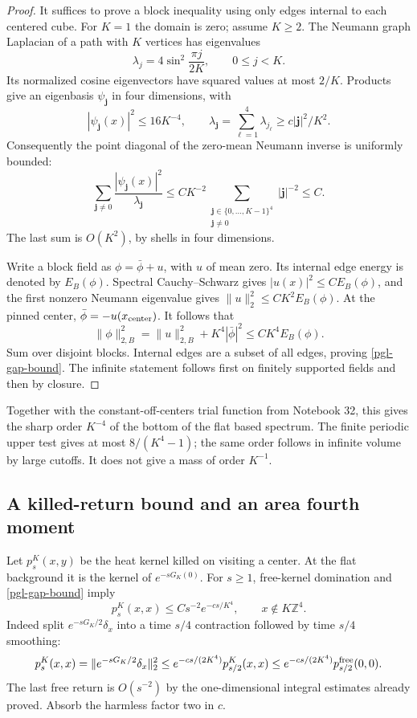 \documentclass[11pt]{article}
\theoremstyle{remark}
\begin{document}
\begin{proof}
It suffices to prove a block inequality using only
edges internal to each centered cube. For \(K=1\)
the domain is zero; assume \(K\ge2\).
The Neumann graph Laplacian of a path with \(K\)
vertices has eigenvalues
\[
 \lambda_j=4\sin^2\frac{\pi j}{2K},\qquad
                  0\le j<K.
\]
Its normalized cosine eigenvectors have squared
values at most \(2/K\). Products give an eigenbasis
\(\psi_{\boldsymbol j}\) in four dimensions, with
\[
 |\psi_{\boldsymbol j}(x)|^2\le16K^{-4},\qquad
 \lambda_{\boldsymbol j}
       =\sum_{\ell=1}^4\lambda_{j_\ell}
                          \ge c|\boldsymbol j|^2/K^2.
\]
Consequently the point diagonal of the zero-mean
Neumann inverse is uniformly bounded:
\[
 \sum_{\boldsymbol j\ne0}
       \frac{|\psi_{\boldsymbol j}(x)|^2}
            {\lambda_{\boldsymbol j}}
 \le CK^{-2}
       \sum_{\substack{\boldsymbol j\in\{0,\ldots,K-1\}^4\\
                        \boldsymbol j\ne0}}
                              |\boldsymbol j|^{-2}\le C.
\]
The last sum is \(O(K^2)\), by shells in four dimensions.

Write a block field as \(\phi=\bar\phi+u\), with
\(u\) of mean zero. Its internal edge energy is
denoted by \(E_B(\phi)\). Spectral Cauchy--Schwarz
gives \(|u(x)|^2\le C E_B(\phi)\), and the first
nonzero Neumann eigenvalue gives
\(\|u\|_2^2\le CK^2 E_B(\phi)\).
At the pinned center, \(\bar\phi=-u(x_{\rm center})\).
It follows that
\[
 \|\phi\|_{2,B}^2=\|u\|_{2,B}^2+K^4|\bar\phi|^2
                                  \le CK^4 E_B(\phi).
\]
Sum over disjoint blocks. Internal edges are a
subset of all edges, proving \eqref{pgl-gap-bound}.
The infinite statement follows first on finitely
supported fields and then by closure.
\end{proof}

Together with the constant-off-centers trial function
from Notebook 32, this gives the sharp order \(K^{-4}\)
of the bottom of the flat based spectrum. The finite
periodic upper test gives at most \(8/(K^4-1)\);
the same order follows in infinite volume by large
cutoffs. It does not give a mass of order \(K^{-1}\).

\subsection{A killed-return bound and an area fourth moment}
\label{pgl-tail-inputs-section}

Let \(p_s^K(x,y)\) be the heat kernel killed on visiting
a center. At the flat background it is the kernel of
\(e^{-sG_K(0)}\). For \(s\ge1\), free-kernel domination
and \eqref{pgl-gap-bound} imply
\begin{equation}
 p_s^K(x,x)\le Cs^{-2}e^{-c s/K^4},
                         \qquad x\notin K\mathbb Z^4.
 \label{pgl-killed-return}
\end{equation}
Indeed split \(e^{-sG_K/2}\delta_x\) into a time
\(s/4\) contraction followed by time \(s/4\)
smoothing:
\[
 p_s^K(x,x)
 =\|e^{-sG_K/2}\delta_x\|_2^2
 \le e^{-c s/(2K^4)}p_{s/2}^K(x,x)
 \le e^{-c s/(2K^4)}p_{s/2}^{\rm free}(0,0).
\]
The last free return is \(O(s^{-2})\) by the
one-dimensional integral estimates already proved.
Absorb the harmless factor two in \(c\).
\end{document}
